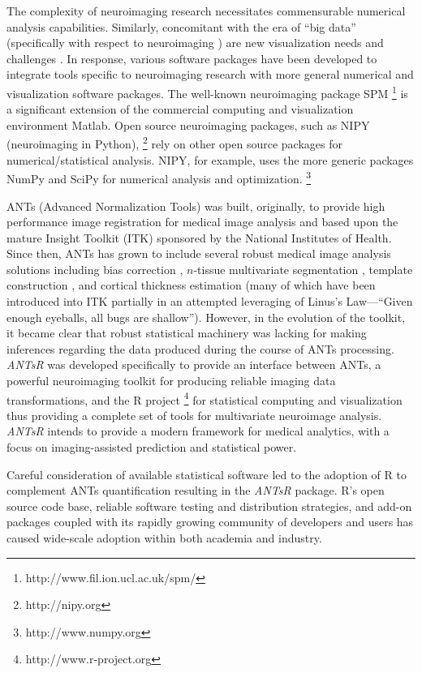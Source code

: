 \documentclass[preprint,authoryear,review,12pt]{elsarticle}
\begin{document}
{The complexity of neuroimaging research necessitates 
commensurable numerical analysis capabilities.  Similarly, concomitant
with the era of ``big data'' (specifically with respect to neuroimaging
\citep{vanhorn2013}) are new visualization needs and challenges
\citep{childs2013,kehrer2013}.
In response, various software packages have been developed to
integrate tools specific to neuroimaging research with more general
numerical and visualization software packages.
The well-known neuroimaging package SPM%
\footnote{
http://www.fil.ion.ucl.ac.uk/spm/
}
is a significant extension of the commercial computing and visualization environment
Matlab.  Open source neuroimaging packages, such as NIPY (neuroimaging in Python),%
\footnote{
http://nipy.org
} 
rely on other open source packages for numerical/statistical analysis.  NIPY,
for example, uses the more generic packages NumPy and SciPy for numerical analysis and 
optimization.%
\footnote{
http://www.numpy.org
}  

ANTs (Advanced Normalization Tools) was built, originally, to provide 
high performance image registration for medical image analysis
\citep{avants2008a} and based upon the mature Insight Toolkit (ITK)
sponsored by the National Institutes of Health.  Since then, ANTs has grown to include 
several robust medical image analysis solutions including bias 
correction \citep{tustison2010}, $n$-tissue multivariate segmentation 
\citep{avants2011}, template construction \citep{avants2010}, and cortical 
thickness estimation \citep{das2009} (many of which have been
introduced into ITK partially in an attempted leveraging of Linus's Law---``Given enough eyeballs, all bugs are shallow'').  
However, in the evolution of the toolkit, it became clear 
that robust statistical machinery was lacking for making inferences regarding
the data produced during the course of ANTs processing.  \textit{ANTsR} was developed
specifically to provide an interface between ANTs, a 
powerful neuroimaging toolkit for producing reliable imaging data 
transformations, and the R project%
\footnote{
http://www.r-project.org
}
for statistical computing and visualization thus providing a complete
set of tools for multivariate neuroimage analysis.  
 \textit{ANTsR} intends to provide a modern framework for medical analytics, 
 with a focus on imaging-assisted prediction and statistical power.


Careful consideration of available statistical software 
led to the adoption of R to complement ANTs quantification resulting in the
\textit{ANTsR} package.
R's open source code base, reliable software testing and distribution strategies,
and add-on packages coupled with its rapidly growing 
community of developers and users has caused wide-scale
adoption within both academia and industry.

}
\end{document}
